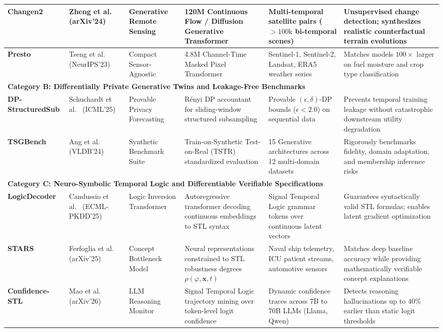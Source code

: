 \begin{table}[t]
{\begin{tabular}{llllll}
\midrule
\textbf{Changen2} & Zheng et al.~\cite{zheng2024changen2} (arXiv'24) & Generative Remote Sensing & 120M Continuous Flow / Diffusion Generative Transformer & Multi-temporal satellite pairs ($>100\text{k}$ bi-temporal scenes) & Unsupervised change detection; synthesizes realistic counterfactual terrain evolutions \\
\midrule
\textbf{Presto} & Tseng et al.~\cite{tseng2023presto} (NeurIPS'23) & Compact Sensor-Agnostic & 4.8M Channel-Time Masked Pixel Transformer & Sentinel-1, Sentinel-2, Landsat, ERA5 weather series & Matches models $100\times$ larger on fuel moisture and crop type classification \\
\midrule
\multicolumn{6}{l}{\textbf{Category B: Differentially Private Generative Twins and Leakage-Free Benchmarks}} \\
\midrule
\textbf{DP-StructuredSub} & Schuchardt et al.~\cite{schuchardt2025privacy} (ICML'25) & Provable Privacy Forecasting & Rényi DP accountant for sliding-window structured subsampling & Provable $(\epsilon, \delta)$-DP bounds ($\epsilon < 2.0$) on sequential data & Prevents temporal training leakage without catastrophic downstream utility degradation \\
\midrule
\textbf{TSGBench} & Ang et al.~\cite{ang2024tsgbench} (VLDB'24) & Synthetic Benchmark Suite & Train-on-Synthetic Test-on-Real (TSTR) standardized evaluation & 15 Generative architectures across 12 multi-domain datasets & Rigorously benchmarks fidelity, domain adaptation, and membership inference risks \\
\midrule
\multicolumn{6}{l}{\textbf{Category C: Neuro-Symbolic Temporal Logic and Differentiable Verifiable Specifications}} \\
\midrule
\textbf{LogicDecoder} & Candussio et al.~\cite{candussio2025decoding} (ECML-PKDD'25) & Logic Inversion Transformer & Autoregressive transformer decoding continuous embeddings to STL syntax & Signal Temporal Logic grammar tokens over continuous latent vectors & Guarantees syntactically valid STL formulas; enables latent gradient optimization \\
\midrule
\textbf{STARS} & Ferfoglia et al.~\cite{ferfoglia2025stars} (arXiv'25) & Concept Bottleneck Model & Neural representations constrained to STL robustness degrees $\rho(\varphi, \mathbf{x}, t)$ & Naval ship telemetry, ICU patient streams, automotive sensors & Matches deep baseline accuracy while providing mathematically verifiable concept explanations \\
\midrule
\textbf{Confidence-STL} & Mao et al.~\cite{mao2026confidence} (arXiv'26) & LLM Reasoning Monitor & Signal Temporal Logic trajectory mining over token-level logit confidence & Dynamic confidence traces across 7B to 70B LLMs (Llama, Qwen) & Detects reasoning hallucinations up to $40\%$ earlier than static logit thresholds \\

\end{tabular}}
\end{table}
